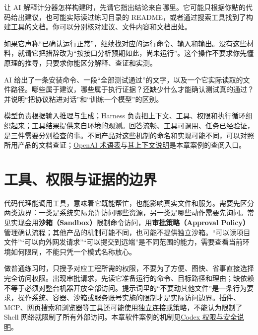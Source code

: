 \begin{example}
让 AI 解释计分器怎样构建时，先请它指出结论来自哪里。它可能只根据你贴的代码给出建议，也可能实际读过练习目录的 README，或者通过搜索工具找到了构建工具的文档。你可以分别核对建议、文件内容和文档出处。

如果它声称“已确认运行正常”，继续找对应的运行命令、输入和输出。没有这些材料，就请它把措辞改为“按接口分析预期如此，尚未运行”。这个操作不要求你先懂原理的推导，只要求你能区分解释、查证和实测。
\end{example}

\begin{exercise}\label{ex:ai-principle-model-agent}
AI 给出了一条安装命令、一段“全部测试通过”的文字，以及一个它实际读取的文件路径。哪些属于建议，哪些属于执行证据？还缺少什么才能确认测试真的通过？并说明“把协议粘进对话”和“训练一个模型”的区别。
\end{exercise}

\begin{conclusion}
模型负责根据输入推理与生成；Harness 负责把上下文、工具、权限和执行循环组织起来；工具结果提供来自环境的观测。回答流畅、工具可调用、任务已经验证，是三件需要分别检查的事。不同产品对这些机制的命名和实现可能不同，可以对照所用产品的文档查证；\href{https://learn.chatgpt.com/docs/glossary}{OpenAI 术语表}与\href{https://developers.openai.com/api/docs/guides/conversation-state#managing-the-context-window}{其上下文说明}是本章案例的查阅入口。
\end{conclusion}

\section{工具、权限与证据的边界}
\label{sec:ai-evidence}

代码代理能调用工具，意味着它既能帮忙，也能影响真实文件和服务。需要先区分两类边界：一类是系统实际允许访问哪些资源，另一类是哪些动作需要先询问。常见实现会用\textbf{沙箱（Sandbox）}限制命令访问，用\textbf{审批策略（Approval Policy）}管理确认流程；其他产品的机制可能不同，也可能不提供独立沙箱。“可以读项目文件”“可以向外网发请求”“可以提交到远端”是不同范围的能力，需要查看当前环境如何限制，不能只凭一个模式名称放心。

做普通练习时，只授予对应工程所需的权限，不要为了方便、图快、省事直接选择完全访问权限。出现审批请求，先读它准备运行的命令、目标路径和理由；缺依赖不等于必须对整台机器开放全部访问。提示词里的“不要动其他文件”是一条行为要求，操作系统、容器、沙箱或服务账号实施的限制才是实际访问边界。插件、MCP、网页搜索和浏览器等工具还可能使用独立连接或策略，不能认为限制了 Shell 网络就限制了所有外部访问。本章软件案例的机制见\href{https://learn.chatgpt.com/docs/agent-approvals-security}{Codex 权限与安全说明}。

